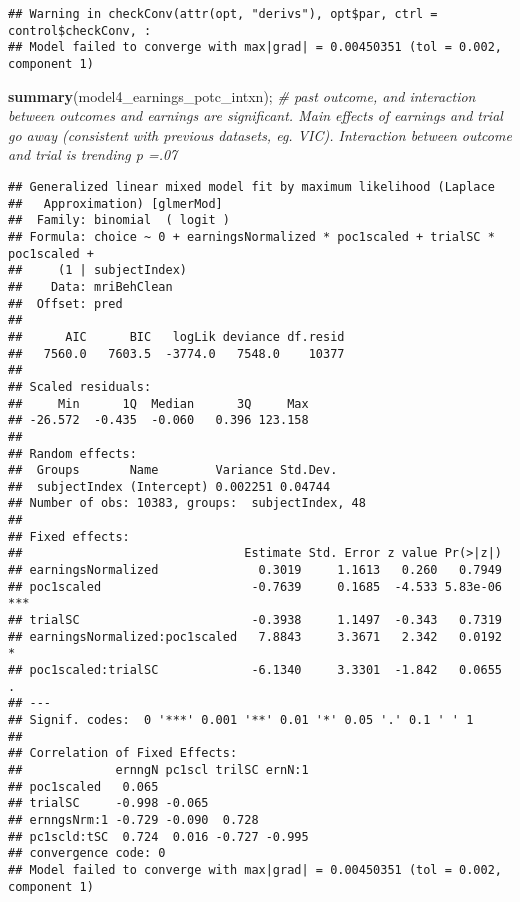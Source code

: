 \documentclass[]{article}
\newenvironment{Shaded}{\begin{snugshade}}{\end{snugshade}}
\newcommand{\CommentTok}[1]{\textcolor[rgb]{0.56,0.35,0.01}{\textit{#1}}}
\newcommand{\KeywordTok}[1]{\textcolor[rgb]{0.13,0.29,0.53}{\textbf{#1}}}
\newcommand{\NormalTok}[1]{#1}
\begin{document}
\begin{verbatim}
## Warning in checkConv(attr(opt, "derivs"), opt$par, ctrl = control$checkConv, :
## Model failed to converge with max|grad| = 0.00450351 (tol = 0.002, component 1)
\end{verbatim}

\begin{Shaded}
\begin{Highlighting}[]
\KeywordTok{summary}\NormalTok{(model4_earnings_potc_intxn); }\CommentTok{# past outcome, and interaction between outcomes and earnings are significant. Main effects of earnings and trial go away (consistent with previous datasets, eg. VIC). Interaction between outcome and trial is trending p =.07}
\end{Highlighting}
\end{Shaded}

\begin{verbatim}
## Generalized linear mixed model fit by maximum likelihood (Laplace
##   Approximation) [glmerMod]
##  Family: binomial  ( logit )
## Formula: choice ~ 0 + earningsNormalized * poc1scaled + trialSC * poc1scaled +  
##     (1 | subjectIndex)
##    Data: mriBehClean
##  Offset: pred
## 
##      AIC      BIC   logLik deviance df.resid 
##   7560.0   7603.5  -3774.0   7548.0    10377 
## 
## Scaled residuals: 
##     Min      1Q  Median      3Q     Max 
## -26.572  -0.435  -0.060   0.396 123.158 
## 
## Random effects:
##  Groups       Name        Variance Std.Dev.
##  subjectIndex (Intercept) 0.002251 0.04744 
## Number of obs: 10383, groups:  subjectIndex, 48
## 
## Fixed effects:
##                               Estimate Std. Error z value Pr(>|z|)    
## earningsNormalized              0.3019     1.1613   0.260   0.7949    
## poc1scaled                     -0.7639     0.1685  -4.533 5.83e-06 ***
## trialSC                        -0.3938     1.1497  -0.343   0.7319    
## earningsNormalized:poc1scaled   7.8843     3.3671   2.342   0.0192 *  
## poc1scaled:trialSC             -6.1340     3.3301  -1.842   0.0655 .  
## ---
## Signif. codes:  0 '***' 0.001 '**' 0.01 '*' 0.05 '.' 0.1 ' ' 1
## 
## Correlation of Fixed Effects:
##             ernngN pc1scl trilSC ernN:1
## poc1scaled   0.065                     
## trialSC     -0.998 -0.065              
## ernngsNrm:1 -0.729 -0.090  0.728       
## pc1scld:tSC  0.724  0.016 -0.727 -0.995
## convergence code: 0
## Model failed to converge with max|grad| = 0.00450351 (tol = 0.002, component 1)
\end{verbatim}
\end{document}
